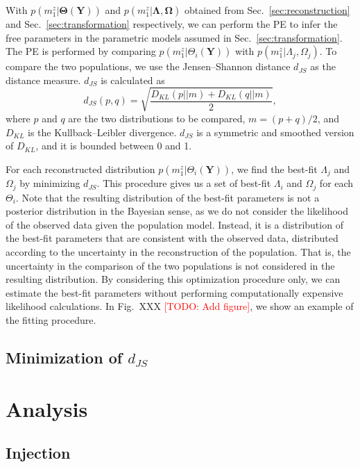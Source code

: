 \documentclass[aps,prd,twocolumn,superscriptaddress,preprintnumbers,nofootinbib,hidelinks]{revtex4-2}
\newcommand{\todo}[1]{\textcolor{red}{[TODO: #1]}}
\begin{document}
With $p(m^z_1|\mathbf{\Theta}(\mathbf{Y}))$ and $p(m^z_1|\mathbf{\Lambda}, \mathbf{\Omega})$ obtained from Sec.~\ref{sec:reconstruction} and Sec.~\ref{sec:transformation} respectively, we can perform the \ac{PE} to infer the free parameters in the parametric models assumed in Sec.~\ref{sec:transformation}.
The \ac{PE} is performed by comparing $p(m^z_1|\Theta_i(\mathbf{Y}))$ with $p(m^z_1|\Lambda_j, \Omega_j)$.
To compare the two populations, we use the Jensen–Shannon distance $d_{JS}$ as the distance measure.
$d_{JS}$ is calculated as
\begin{equation}
    d_{JS}(p, q) = \sqrt{\frac{D_{KL}(p||m) + D_{KL}(q||m)}{2}},
\end{equation}
where $p$ and $q$ are the two distributions to be compared, $m = (p + q) / 2$, and $D_{KL}$ is the Kullback–Leibler divergence.
$d_{JS}$ is a symmetric and smoothed version of $D_{KL}$, and it is bounded between 0 and 1.

For each reconstructed distribution $p(m^z_1|\Theta_i(\mathbf{Y}))$, we find the best-fit $\Lambda_j$ and $\Omega_j$ by minimizing $d_{JS}$.
This procedure gives us a set of best-fit $\Lambda_i$ and $\Omega_j$ for each $\Theta_i$.
Note that the resulting distribution of the best-fit parameters is not a posterior distribution in the Bayesian sense, as we do not consider the likelihood of the observed data given the population model.
Instead, it is a distribution of the best-fit parameters that are consistent with the observed data, distributed according to the uncertainty in the reconstruction of the population.
That is, the uncertainty in the comparison of the two populations is not considered in the resulting distribution.
By considering this optimization procedure only, we can estimate the best-fit parameters without performing computationally expensive likelihood calculations.
In Fig.~XXX \todo{Add figure}, we show an example of the fitting procedure.

\subsection{Minimization of $d_{JS}$}
\label{sec:minimization}

\section{Analysis}
\label{sec:analysis}

\subsection{Injection}
\label{sec:injection-setup}
\end{document}
